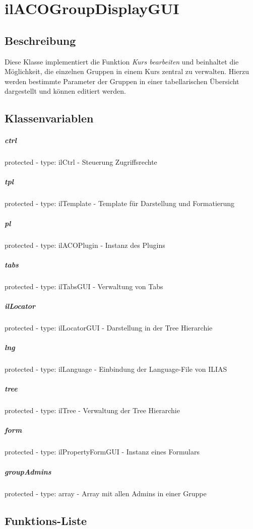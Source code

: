 \section{ilACOGroupDisplayGUI}

\subsection*{Beschreibung}
Diese Klasse implementiert die Funktion \textit{Kurs bearbeiten} und beinhaltet die Möglichkeit, die einzelnen Gruppen in einem Kurs zentral zu verwalten. 
Hierzu werden bestimmte Parameter der Gruppen in einer tabellarischen Übersicht dargestellt und können editiert werden.

\subsection*{Klassenvariablen}
\subparagraph{ctrl}
protected - type: ilCtrl - Steuerung Zugriffsrechte
\subparagraph{tpl}
protected - type: ilTemplate - Template für Darstellung und Formatierung
\subparagraph{pl}
protected - type: ilACOPlugin - Instanz des Plugins
\subparagraph{tabs}
protected - type: ilTabsGUI - Verwaltung von Tabs
\subparagraph{ilLocator}
protected - type: ilLocatorGUI - Darstellung in der Tree Hierarchie
\subparagraph{lng}
protected - type: ilLanguage - Einbindung der Language-File von ILIAS
\subparagraph{tree}
protected - type: ilTree - Verwaltung der Tree Hierarchie
\subparagraph{form}
protected - type: ilPropertyFormGUI - Instanz eines Formulars
\subparagraph{groupAdmins}
protected - type: array - Array mit allen Admins in einer Gruppe

\subsection*{Funktions-Liste}
\subparagraph{}
\subparagraph{}
\subparagraph{}
\subparagraph{}
\subparagraph{}
\subparagraph{}
\subparagraph{}
\subparagraph{}
\subparagraph{}
\subparagraph{}
\subparagraph{}
\subparagraph{}
\subparagraph{}
\subparagraph{}
\subparagraph{}
\subparagraph{}


